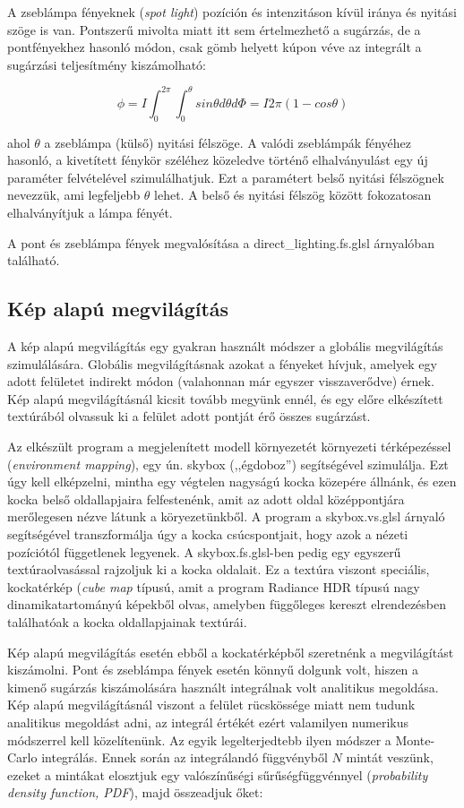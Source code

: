 A zseblámpa fényeknek (\textit{spot light}) pozíción és intenzitáson kívül iránya és nyitási szöge is van. Pontszerű mivolta miatt itt sem értelmezhető a sugárzás, de a pontfényekhez hasonló módon, csak gömb helyett kúpon véve az integrált a sugárzási teljesítmény kiszámolható:

\[
\phi = I \int_0^{2\pi} { \int_0^\theta { sin\theta d\theta d\Phi } } = I 2\pi (1 - cos\theta)
\]

ahol \(\theta\) a zseblámpa (külső) nyitási félszöge. A valódi zseblámpák fényéhez hasonló, a kivetített fénykör széléhez közeledve történő elhalványulást egy új paraméter felvételével szimulálhatjuk. Ezt a paramétert belső nyitási félszögnek nevezzük, ami legfeljebb \(\theta\) lehet. A belső és nyitási félszög között fokozatosan elhalványítjuk a lámpa fényét.

A pont és zseblámpa fények megvalósítása a direct\_lighting.fs.glsl árnyalóban található.

\subsection{Kép alapú megvilágítás}

A kép alapú megvilágítás egy gyakran használt módszer a globális megvilágítás szimulálására. Globális megvilágításnak azokat a fényeket hívjuk, amelyek egy adott felületet indirekt módon (valahonnan már egyszer visszaverődve) érnek. Kép alapú megvilágításnál kicsit tovább megyünk ennél, és egy előre elkészített textúrából olvassuk ki a felület adott pontját érő összes sugárzást.

Az elkészült program a megjelenített modell környezetét környezeti térképezéssel (\textit{environment mapping}), egy ún. skybox (,,égdoboz'') segítségével szimulálja. Ezt úgy kell elképzelni, mintha egy végtelen nagyságú kocka közepére állnánk, és ezen kocka belső oldallapjaira felfestenénk, amit az adott oldal középpontjára merőlegesen nézve látunk a köryezetünkből. A program a skybox.vs.glsl árnyaló segítségével transzformálja úgy a kocka csúcspontjait, hogy azok a nézeti pozíciótól függetlenek legyenek. A skybox.fs.glsl-ben pedig egy egyszerű textúraolvasással rajzoljuk ki a kocka oldalait. Ez a textúra viszont speciális, kockatérkép (\textit{cube map} típusú, amit a program Radiance HDR típusú nagy dinamikatartományú képekből olvas, amelyben függőleges kereszt elrendezésben találhatóak a kocka oldallapjainak textúrái.

Kép alapú megvilágítás esetén ebből a kockatérképből szeretnénk a megvilágítást kiszámolni. Pont és zseblámpa fények esetén könnyű dolgunk volt, hiszen a kimenő sugárzás kiszámolására használt integrálnak volt analitikus megoldása. Kép alapú megvilágításnál viszont a felület rücskössége miatt nem tudunk analitikus megoldást adni, az integrál értékét ezért valamilyen numerikus módszerrel kell közelítenünk. Az egyik legelterjedtebb ilyen módszer a Monte-Carlo integrálás. Ennek során az integrálandó függvényből \(N\) mintát veszünk, ezeket a mintákat elosztjuk egy valószínűségi sűrűségfüggvénnyel (\textit{probability density function, PDF}), majd összeadjuk őket:

